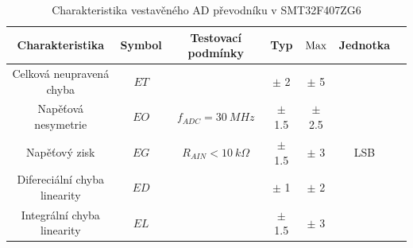 \begin{table}[H]
    \label{tab:stm_adc_error}
    \caption{Charakteristika vestavěného AD převodníku v SMT32F407ZG6}
    \hspace*{-1.3cm}
    \begin{ctucolortab}
        \begin{tabular}{ccccccc}
            \toprule
            Charakteristika               & Symbol & Testovací podmínky       & Typ       & $\textnormal{Max}$ & Jednotka & \\ \midrule
            Celková neupravená chyba      & $ET$   &                          & $\pm$ 2   & $\pm$ 5            &          & \\
            Napěťová nesymetrie           & $EO$   & $f_{ADC} = 30 \ MHz$     & $\pm$ 1.5 & $\pm$ 2.5          &          & \\
            Napěťový zisk                 & $EG$   & $R_{AIN} < 10 \ k\Omega$ & $\pm$ 1.5 & $\pm$ 3            & LSB      & \\
            Difereciální  chyba linearity & $ED$   &                          & $\pm$ 1   & $\pm$ 2            &          & \\
            Integrální chyba linearity    & $EL$   &                          & $\pm$ 1.5 & $\pm$ 3            &          & \\
            \bottomrule
        \end{tabular}
    \end{ctucolortab}
\end{table}

